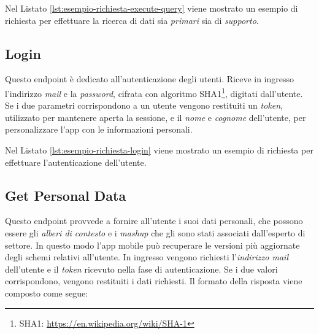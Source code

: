 Nel Listato \ref{lst:esempio-richiesta-execute-query} viene mostrato un esempio di richiesta per effettuare la ricerca di dati sia \emph{primari} sia di \emph{supporto}.



\subsection{Login\label{sec:login-endpoint}}

Questo endpoint è dedicato all'autenticazione degli utenti. Riceve in ingresso l'indirizzo \emph{mail} e la \emph{password}, cifrata con algoritmo SHA1\footnote{SHA1: \url{https://en.wikipedia.org/wiki/SHA-1}}, digitati dall'utente. Se i due parametri corrispondono a un utente vengono restituiti un \emph{token}, utilizzato per mantenere aperta la sessione, e il \emph{nome} e \emph{cognome} dell'utente, per personalizzare l'app con le informazioni personali.

Nel Listato \ref{lst:esempio-richiesta-login} viene mostrato un esempio di richiesta per effettuare l'autenticazione dell'utente.



\subsection{Get Personal Data\label{sec:get-personal-data-endpoint}}

Questo endpoint provvede a fornire all'utente i suoi dati personali, che possono essere gli \emph{alberi di contesto} e i \emph{mashup} che gli sono stati associati dall'esperto di settore. In questo modo l'app mobile può recuperare le versioni più aggiornate degli schemi relativi all'utente. In ingresso vengono richiesti l'\emph{indirizzo mail} dell'utente e il \emph{token} ricevuto nella fase di autenticazione. Se i due valori corrispondono, vengono restituiti i dati richiesti. Il formato della risposta viene composto come segue:

